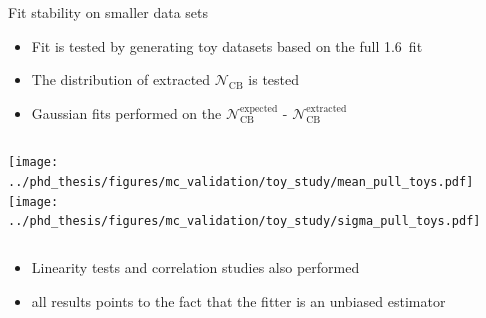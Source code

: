 \documentclass[xcolor=dvipsnames]{beamer}
\begin{document}
\begin{frame}{Fit stability on smaller data sets}
   \scriptsize\centering
      \begin{itemize}
         \item Fit is tested by generating toy datasets based on the full 1.6~\invab fit
         \item The distribution of extracted $\mathcal{N}_{\mathrm{CB}}$ is tested
         \item Gaussian fits performed on the $\mathcal{N}_{\mathrm{CB}}^{\mathrm{expected}}$ - $\mathcal{N}_{\mathrm{CB}}^{\mathrm{extracted}}$
      \end{itemize}
   
   \begin{columns}
      \texttt{[image: ../phd\_thesis/figures/mc\_validation/toy\_study/mean\_pull\_toys.pdf]}
      \texttt{[image: ../phd\_thesis/figures/mc\_validation/toy\_study/sigma\_pull\_toys.pdf]}
   \end{columns}
   
   \begin{itemize}
      \item Linearity tests and correlation studies also performed
      \item[\ra] all results points to the fact that the fitter is an unbiased estimator
   \end{itemize}
   
   
   
   
   
   \end{frame}
\end{document}
